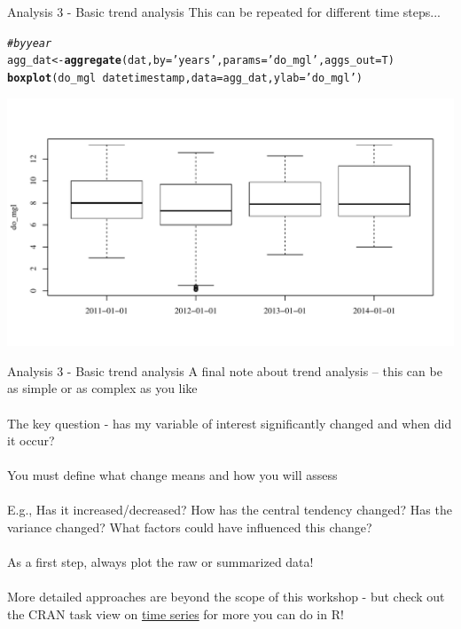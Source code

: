 \documentclass[xcolor=svgnames]{beamer}\usepackage[]{graphicx}\usepackage[]{color}
\makeatletter
\newcommand{\hlstr}[1]{\textcolor[rgb]{0.192,0.494,0.8}{#1}}%
\newcommand{\hlcom}[1]{\textcolor[rgb]{0.678,0.584,0.686}{\textit{#1}}}%
\newcommand{\hlopt}[1]{\textcolor[rgb]{0,0,0}{#1}}%
\newcommand{\hlstd}[1]{\textcolor[rgb]{0.345,0.345,0.345}{#1}}%
\newcommand{\hlkwb}[1]{\textcolor[rgb]{0.69,0.353,0.396}{#1}}%
\newcommand{\hlkwc}[1]{\textcolor[rgb]{0.333,0.667,0.333}{#1}}%
\newcommand{\hlkwd}[1]{\textcolor[rgb]{0.737,0.353,0.396}{\textbf{#1}}}%
\newenvironment{kframe}{%
 \def\at@end@of@kframe{}%
 \ifinner\ifhmode%
  \def\at@end@of@kframe{\end{minipage}}%
  \begin{minipage}{\columnwidth}%
 \fi\fi%
 \def\FrameCommand##1{\hskip\@totalleftmargin \hskip-\fboxsep
 \colorbox{shadecolor}{##1}\hskip-\fboxsep
     \hskip-\linewidth \hskip-\@totalleftmargin \hskip\columnwidth}%
 \MakeFramed {\advance\hsize-\width
   \@totalleftmargin\z@ \linewidth\hsize
   \@setminipage}}%
 {\par\unskip\endMakeFramed%
 \at@end@of@kframe}
\newenvironment{knitrout}{}{} %
\makeatother
\begin{document}
\begin{frame}[containsverbatim]{Analysis 3 - Basic trend analysis}
This can be repeated for different time steps...
\begin{knitrout}\scriptsize
{}\color{fgcolor}\begin{kframe}
\begin{alltt}
\hlcom{# by year}
\hlstd{agg_dat} \hlkwb{<-} \hlkwd{aggregate}\hlstd{(dat,} \hlkwc{by} \hlstd{=} \hlstr{'years'}\hlstd{,} \hlkwc{params} \hlstd{=} \hlstr{'do_mgl'}\hlstd{,} \hlkwc{aggs_out} \hlstd{= T)}
\hlkwd{boxplot}\hlstd{(do_mgl} \hlopt{~} \hlstd{datetimestamp,} \hlkwc{data} \hlstd{= agg_dat,} \hlkwc{ylab} \hlstd{=} \hlstr{'do_mgl'}\hlstd{)}
\end{alltt}
\end{kframe}

{\centering \includegraphics[width=\textwidth]{figure/unnamed-chunk-20} 

}



\end{knitrout}
\end{frame}

\begin{frame}{Analysis 3 - Basic trend analysis}
A final note about trend analysis -- this can be as simple or as complex as you like \\~\\
The key question - has my variable of interest significantly changed and when did it occur? \\~\\
You must define what change means and how you will assess \\~\\
E.g., Has it increased/decreased?  How has the central tendency changed?  Has the variance changed?  What factors could have influenced this change?  \\~\\
As a first step, always plot the raw or summarized data! \\~\\
More detailed approaches are beyond the scope of this workshop - but check out the CRAN task view on \href{http://cran.r-project.org/web/views/TimeSeries.html}{time series} for more you can do in R!
\end{frame}
\end{document}
